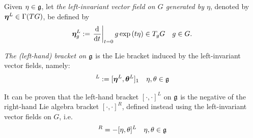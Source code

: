 


\begin{definition}
 Given $\eta \in \mathfrak{g}$, let \emph{the left-invariant vector field on $G$ generated by $\eta$}, denoted by $\bm{\eta}^L \in \Gamma(TG)$, be defined by
\begin{align}
    \sect \eta^L_g := \der{t}[t = 0] g \exp{(t \eta)} \in T_g G && g \in G.
\end{align}

\emph{The (left-hand) bracket on $\mathfrak{g}$} is the Lie bracket induced by the left-invariant vector fields, namely:
\begin{align}
    [\eta, \theta]^L := [\sect \eta^L, \sect \theta^L]_1 && \eta, \theta \in \alg g
\end{align}
\end{definition}

It can be proven that the left-hand bracket $[\cdot, \cdot]^L$ on $\mathfrak{g}$ is the negative of the right-hand Lie algebra bracket $[\cdot, \cdot]^R$, defined instead using the left-invariant vector fields on $G$, i.e.
\begin{align}
    [\eta, \theta]^R = -[\eta, \theta]^L && \eta, \theta \in \alg g
\end{align}

